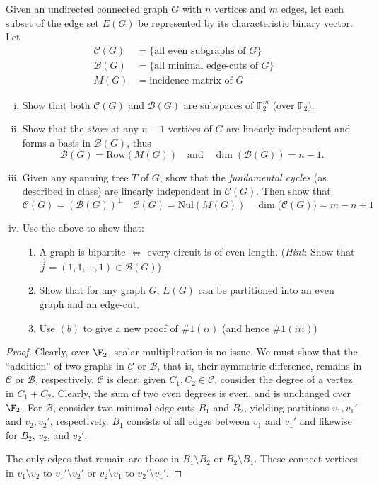\documentclass[11pt,letterpaper]{article}
\begin{document}
\begin{quest}[\textcolor{red}{Cycle Space and Bond Space in Graphs + some applications}]
    Given an undirected connected graph $G$ with $n$ vertices and $m$ edges, let each subset of the edge set $E(G)$ be represented by its characteristic binary vector. Let 
    \begin{align*}
        \mathcal{C}(G)&=\{\text{all even subgraphs of } G \}\\
        \mathcal{B}(G)&=\{\text{all minimal edge-cuts of } G\}\\
        M(G)&= \text{incidence matrix of } G
    \end{align*}
    \begin{enumerate}[(i)]
        \item Show that both $\mathcal{C}(G)$ and $\mathcal{B}(G)$ are subspaces of $\mathbb{F}_2^m$ (over $\mathbb{F}_2)$.
        \item Show that the \textit{stars} at any $n-1$ vertices of $G$ are linearly independent and forms a basis in $\mathcal{B}(G)$, thus \[\mathcal{B}(G)=\text{Row}(M(G))\quad\text{and}\quad \dim(\mathcal{B}(G))=n-1.\]
        \item Given any spanning tree $T$ of $G$, show that the \textit{fundamental cycles} (as described in class) are linearly independent in $\mathcal{C}(G)$. Then show that 
        \[\mathcal{C}(G)=(\mathcal{B}(G))^{\perp}\quad\mathcal{C}(G)=\text{Nul}(M(G))\quad \dim\big(\mathcal{C}(G)\big)=m-n+1\]
        \item Use the above to show that:
        \begin{enumerate}
            \item A graph is bipartite $\iff$ every circuit is of even length. (\textit{Hint}: Show that $\overrightarrow{j}=(1,1,\cdots, 1)\in \mathcal{B}(G)$)
            \item Show that for any graph $G$, $E(G)$ can be partitioned into an even graph and an edge-cut.
            \item Use $(b)$ to give a new proof of $\# 1(ii)$ (and hence $\# 1(iii)$)
        \end{enumerate}
    \end{enumerate}
\end{quest}
\begin{proof}
    Clearly, over $\F_2$, scalar multiplication is no issue. We must show that the ``addition'' of two graphs in $\mathcal{C}$ or $\mathcal{B}$, that is, their symmetric difference, remains in $\mathcal{C}$ or $\mathcal{B}$, respectively. $\mathcal{C}$ is clear; given $C_1,C_2\in\mathcal{C}$, consider the degree of a vertez in $C_1+C_2$. Clearly, the sum of two even degrees is even, and is unchanged over $\F_2$. For $\mathcal{B}$, consider two minimal edge cuts $B_1$ and $B_2$, yielding partitions $v_1, v_1'$ and $v_2, v_2'$, respectively. $B_1$ consists of all edges between $v_1$ and $v_1'$ and likewise for $B_2$, $v_2$, and $v_2'$.

    The only edges that remain are those in $B_1\setminus B_2$ or $B_2\setminus B_1$. These connect vertices in $v_1\setminus v_2$ to $v_1'\setminus v_2'$ or $v_2\setminus v_1$ to $v_2'\setminus v_1'$. 
\end{proof}
\end{document}
